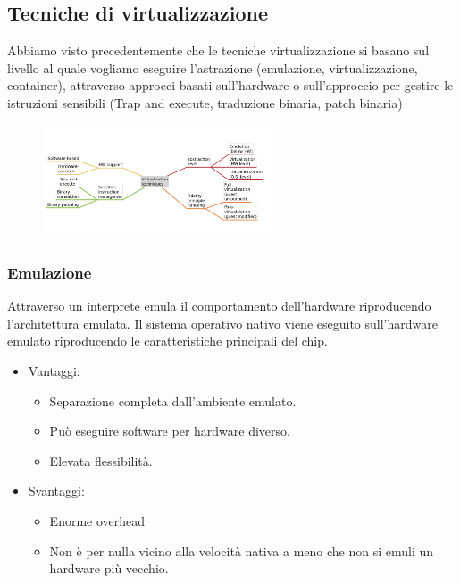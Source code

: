 \documentclass{article}
\begin{document}
		\newpage
		\subsection{Tecniche di virtualizzazione}
		Abbiamo visto precedentemente che le tecniche virtualizzazione si basano sul livello al quale vogliamo eseguire l'astrazione (emulazione, virtualizzazione, container), 
		attraverso approcci basati sull'hardware o sull'approccio per gestire le istruzioni sensibili (Trap and execute, traduzione binaria, patch binaria)
		\begin{figure}[ht]
		    \centering
		    \includegraphics[width=0.6\textwidth]{SAC_B1_virtualizationTechnicques.png}
		\end{figure}
		
		\subsubsection{Emulazione}
		Attraverso un interprete emula il comportamento dell'hardware riproducendo l'architettura emulata. Il sistema operativo nativo viene eseguito sull'hardware emulato riproducendo le caratteristiche principali del chip. 
		\begin{itemize}
		    \item Vantaggi:
		    \begin{itemize}
		        \item Separazione completa dall'ambiente emulato.
		        \item Può eseguire software per hardware diverso.
		        \item Elevata flessibilità.
		    \end{itemize}
		    \item Svantaggi:
		    \begin{itemize}
		        \item Enorme overhead
		        \item Non è per nulla vicino alla velocità nativa a meno che non si emuli un hardware più vecchio.
		    \end{itemize}
		\end{itemize}
		
\end{document}
